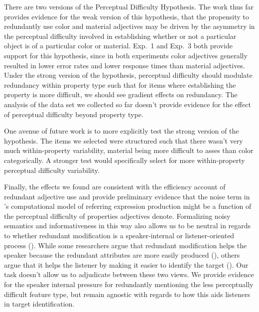 \documentclass[12pt,letterpaper]{article}
\begin{document}
There are two versions of the Perceptual Difficulty Hypothesis. The work thus far provides evidence for the weak version of this hypothesis, that the propensity to redundantly use color and material adjectives may be driven by the asymmetry in the perceptual difficulty involved in establishing whether or not a particular object is of a particular color or material. Exp.~1 and Exp.~3 both provide support for this hypothesis, since in both experiments color adjectives generally resulted in lower error rates and lower response times than material adjectives. Under the strong version of the hypothesis, perceptual difficulty should modulate redundancy within property type such that for items where establishing the property is more difficult, we should see gradient effects on redundancy. The analysis of the data set we collected so far doesn't provide evidence for the effect of perceptual difficulty beyond property type. 

One avenue of future work is to more explicitly test the strong version of the hypothesis. The items we selected were structured such that there wasn't very much within-property variability, material being more difficult to asses than color categorically. A stronger test would specifically select for more within-property perceptual difficulty variability.

Finally, the effects we found are consistent with the efficiency account of redundant adjective use and provide preliminary evidence that the noise term in \citet{DegenEtAl2020}'s computational model of referring expression production might be a function of the perceptual difficulty of properties adjectives denote. Formalizing noisy semantics and informativeness in this way also allows us to be neutral in regards to whether redundant modification is a speaker-internal or listener-oriented process (\citealt{Arnold2008}). While some researchers argue that redundant modification helps the speaker because the redundant attributes are more easily produced (\citealt{DaviesKatsos2013, KoolenEtAl2013}), others argue that it helps the listener by making it easier to identify the target (\citealt{FussellKraus1989a, ArtsEtAl2011,RubioFernandez2016}). Our task doesn't allow us to adjudicate between these two views. We provide evidence for the speaker internal pressure for redundantly mentioning the less perceptually difficult feature type, but remain agnostic with regards to how this aids listeners in target identification.
\end{document}
